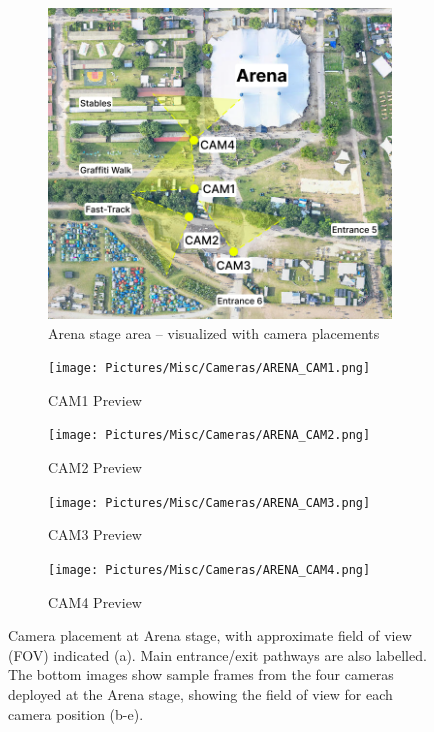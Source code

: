 \begin{figure}[htbp!]
  \centering
  \begin{subfigure}{0.8\textwidth}
    \centering
    \includegraphics[width=\textwidth]{Pictures/Figures/arena_cameras.png}
    \caption{Arena stage area -- visualized with camera placements}

  \end{subfigure}
  \begin{subfigure}{0.37\textwidth}
    \centering
    \texttt{[image: Pictures/Misc/Cameras/ARENA\_CAM1.png]}
    \caption{CAM1 Preview}
  \end{subfigure}%
  \hspace{0.06\textwidth}
  \begin{subfigure}{0.37\textwidth}
    \centering
    \texttt{[image: Pictures/Misc/Cameras/ARENA\_CAM2.png]}
    \caption{CAM2 Preview}
  \end{subfigure}

  \begin{subfigure}{0.37\textwidth}
    \centering
    \texttt{[image: Pictures/Misc/Cameras/ARENA\_CAM3.png]}
    \caption{CAM3 Preview}
  \end{subfigure}%
  \hspace{0.06\textwidth}
  \begin{subfigure}{0.37\textwidth}
    \centering
    \texttt{[image: Pictures/Misc/Cameras/ARENA\_CAM4.png]}
    \caption{CAM4 Preview}
  \end{subfigure}

  \caption{Camera placement at Arena stage, with approximate field of view (FOV) indicated (a). Main entrance/exit pathways are also labelled. The bottom images show sample frames from the four cameras deployed at the Arena stage, showing the field of view for each camera position (b-e).}
  \label{fig:arena_cameras}

\end{figure}


